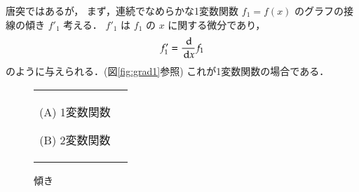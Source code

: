                     唐突ではあるが，
                    まず，連続でなめらかな1変数関数 $f_{1}=f(x)$ のグラフの接線の傾き $f'_{1}$ 考える．
                    $f'_{1}$ は $f_{1}$ の $x$ に関する微分であり，
                    \begin{align}
                    f'_{1}=\frac{\,\mathrm{d} }{\,\mathrm{d} x}f_{1}
                    \end{align}
                    のように与えられる．(図\ref{fig:grad1}参照)
                    これが1変数関数の場合である．

                \begin{figure}[hbt]
                    \begin{tabular}{cc}
                        \begin{minipage}{0.5\hsize}
                                    \begin{center}
                                        {grad1.pdf}

                                        (A) 1変数関数
                                        \label{fig:grad1}
                                    \end{center}
                        \end{minipage}
                        \begin{minipage}{0.5\hsize}
                                    \begin{center}
                                        {grad2.pdf}

                                        (B) 2変数関数
                                        \label{fig:grad2}
                                    \end{center}
                        \end{minipage}
                    \end{tabular}

                        \caption{傾き}
                \end{figure}


